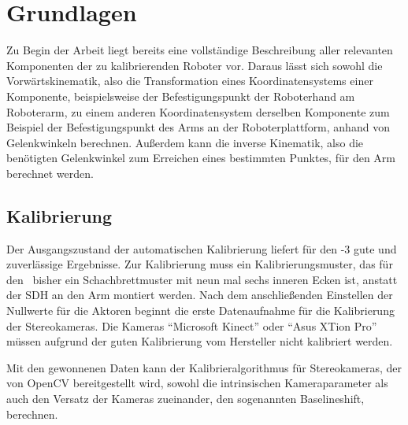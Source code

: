 \chapter{Grundlagen}

\label{sec:Fähigkeiten und Funktionen des cob}

Zu Begin der Arbeit liegt bereits eine vollständige Beschreibung aller
relevanten Komponenten der zu kalibrierenden Roboter vor. Daraus lässt sich
sowohl die Vorwärtskinematik, also die Transformation eines Koordinatensystems
einer Komponente, beispielsweise der Befestigungspunkt der Roboterhand am
Roboterarm, zu einem anderen Koordinatensystem derselben Komponente zum
Beispiel der Befestigungspunkt des Arms an der Roboterplattform, anhand von
Gelenkwinkeln berechnen. Außerdem kann die inverse Kinematik, also die
benötigten Gelenkwinkel zum Erreichen eines bestimmten Punktes, für den Arm
berechnet werden.








\section{Kalibrierung}

Der Ausgangszustand der automatischen Kalibrierung liefert für den -3
gute und zuverlässige Ergebnisse. Zur Kalibrierung muss ein
Kalibrierungsmuster, das für den \cob\ bisher ein Schachbrettmuster mit neun mal
sechs inneren Ecken \cite{opencv_chessboard} ist, anstatt der \ac{SDH} an
den Arm montiert werden. Nach dem anschließenden Einstellen der Nullwerte für
die Aktoren beginnt die erste Datenaufnahme für die Kalibrierung der
Stereokameras. Die Kameras "`Microsoft Kinect"' oder "`Asus XTion Pro"' müssen aufgrund der
guten Kalibrierung vom Hersteller nicht kalibriert werden. 

Mit den gewonnenen Daten kann der Kalibrieralgorithmus für Stereokameras,
der von OpenCV bereitgestellt wird, sowohl die intrinsischen Kameraparameter als
auch den Versatz der Kameras zueinander, den sogenannten Baselineshift,
berechnen.

